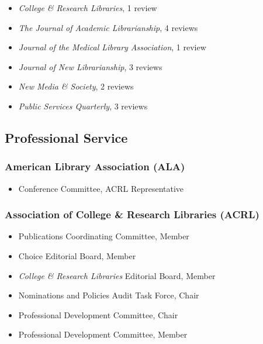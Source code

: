 \documentclass[
  letterpaper,
  DIV=11,
  numbers=noendperiod]{scrartcl}
\providecommand{\tightlist}{%
  \setlength{\itemsep}{0pt}\setlength{\parskip}{0pt}}\usepackage{longtable,booktabs,array}
\begin{document}
\begin{itemize}
\tightlist
\item
  \emph{College \& Research Libraries}, 1 review
\item
  \emph{The Journal of Academic Librarianship}, 4 reviews
\item
  \emph{Journal of the Medical Library Association}, 1 review
\item
  \emph{Journal of New Librarianship}, 3 reviews
\item
  \emph{New Media \& Society}, 2 reviews
\item
  \emph{Public Services Quarterly}, 3 reviews
\end{itemize}

\subsection{\texorpdfstring{ Professional
Service}{ Professional Service}}\label{professional-service}

\subsubsection{American Library Association
(ALA)}\label{american-library-association-ala}

\begin{itemize}
\tightlist
\item
  Conference Committee, ACRL Representative
\end{itemize}

\subsubsection{Association of College \& Research Libraries
(ACRL)}\label{association-of-college-research-libraries-acrl}

\begin{itemize}
\tightlist
\item
  Publications Coordinating Committee, Member
\item
  Choice Editorial Board, Member
\item
  \emph{College \& Research Libraries} Editorial Board, Member
\item
  Nominations and Policies Audit Task Force, Chair
\item
  Professional Development Committee, Chair
\item
  Professional Development Committee, Member
\end{itemize}
\end{document}
